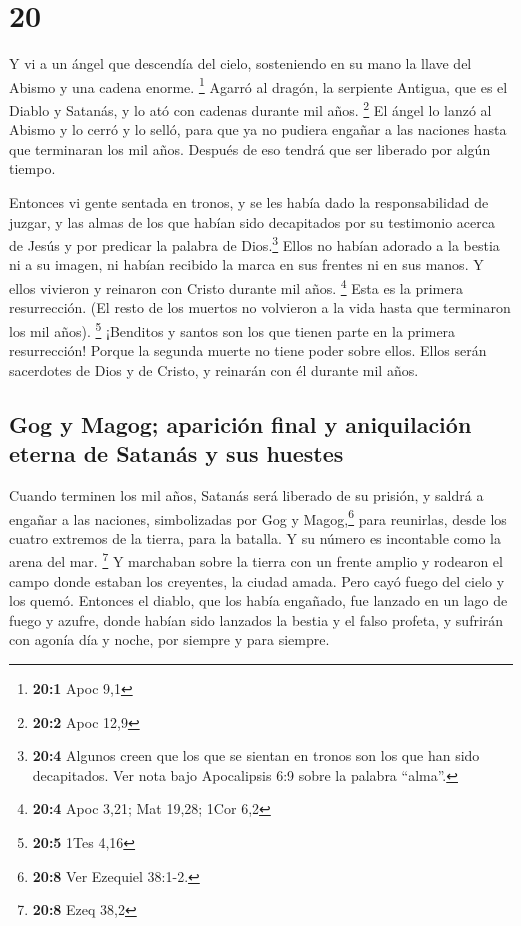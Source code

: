 \hypertarget{section-19}{%
\section{20}\label{section-19}}

 Y vi a un ángel que descendía del cielo, sosteniendo en
su mano la llave del Abismo y una cadena enorme. \footnote{\textbf{20:1}
  Apoc 9,1}  Agarró al dragón, la serpiente Antigua, que
es el Diablo y Satanás, y lo ató con cadenas durante mil años.
\footnote{\textbf{20:2} Apoc 12,9}  El ángel lo lanzó al
Abismo y lo cerró y lo selló, para que ya no pudiera engañar a las
naciones hasta que terminaran los mil años. Después de eso tendrá que
ser liberado por algún tiempo.

 Entonces vi gente sentada en tronos, y se les había dado
la responsabilidad de juzgar, y las almas de los que habían sido
decapitados por su testimonio acerca de Jesús y por predicar la palabra
de Dios.\footnote{\textbf{20:4} Algunos creen que los que se sientan en
  tronos son los que han sido decapitados. Ver nota bajo Apocalipsis 6:9
  sobre la palabra ``alma''.} Ellos no habían adorado a la bestia ni a
su imagen, ni habían recibido la marca en sus frentes ni en sus manos. Y
ellos vivieron y reinaron con Cristo durante mil años. \footnote{\textbf{20:4}
  Apoc 3,21; Mat 19,28; 1Cor 6,2}  Esta es la primera
resurrección. (El resto de los muertos no volvieron a la vida hasta que
terminaron los mil años). \footnote{\textbf{20:5} 1Tes 4,16}
 ¡Benditos y santos son los que tienen parte en la primera
resurrección! Porque la segunda muerte no tiene poder sobre ellos. Ellos
serán sacerdotes de Dios y de Cristo, y reinarán con él durante mil
años.

\hypertarget{gog-y-magog-apariciuxf3n-final-y-aniquilaciuxf3n-eterna-de-satanuxe1s-y-sus-huestes}{%
\subsection{Gog y Magog; aparición final y aniquilación eterna de
Satanás y sus
huestes}\label{gog-y-magog-apariciuxf3n-final-y-aniquilaciuxf3n-eterna-de-satanuxe1s-y-sus-huestes}}

 Cuando terminen los mil años, Satanás será liberado de su
prisión,  y saldrá a engañar a las naciones, simbolizadas
por Gog y Magog,\footnote{\textbf{20:8} Ver Ezequiel 38:1-2.} para
reunirlas, desde los cuatro extremos de la tierra, para la batalla. Y su
número es incontable como la arena del mar. \footnote{\textbf{20:8} Ezeq
  38,2}  Y marchaban sobre la tierra con un frente amplio
y rodearon el campo donde estaban los creyentes, la ciudad amada. Pero
cayó fuego del cielo y los quemó.  Entonces el diablo,
que los había engañado, fue lanzado en un lago de fuego y azufre, donde
habían sido lanzados la bestia y el falso profeta, y sufrirán con agonía
día y noche, por siempre y para siempre.


